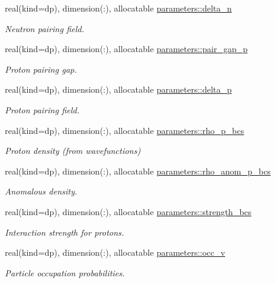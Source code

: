 \begin{DoxyCompactItemize}
real(kind=dp), dimension(\+:), allocatable \mbox{\hyperlink{group__PAIRING_ga1a7cf61c64e34d8c4ff1348bea510826}{parameters\+::delta\+\_\+n}}
\begin{DoxyCompactList}\small\item\em Neutron pairing field. \end{DoxyCompactList}\item 
real(kind=dp), dimension(\+:), allocatable \mbox{\hyperlink{group__PAIRING_ga80c6085ca6be5adceadc0f7167218231}{parameters\+::pair\+\_\+gap\+\_\+p}}
\begin{DoxyCompactList}\small\item\em Proton pairing gap. \end{DoxyCompactList}\item 
real(kind=dp), dimension(\+:), allocatable \mbox{\hyperlink{group__PAIRING_gadffdf74625256112759c5d17e8cfeafc}{parameters\+::delta\+\_\+p}}
\begin{DoxyCompactList}\small\item\em Proton pairing field. \end{DoxyCompactList}\item 
real(kind=dp), dimension(\+:), allocatable \mbox{\hyperlink{group__PAIRING_ga346a8d96825c42b0dcb9763ed8770a68}{parameters\+::rho\+\_\+p\+\_\+bcs}}
\begin{DoxyCompactList}\small\item\em Proton density (from wavefunctions) \end{DoxyCompactList}\item 
real(kind=dp), dimension(\+:), allocatable \mbox{\hyperlink{group__PAIRING_ga5ad9bf187e94e8effb3d4bbcc2f2495f}{parameters\+::rho\+\_\+anom\+\_\+p\+\_\+bcs}}
\begin{DoxyCompactList}\small\item\em Anomalous density. \end{DoxyCompactList}\item 
real(kind=dp), dimension(\+:), allocatable \mbox{\hyperlink{group__PAIRING_ga94c22855af03bc8be5e687f4c8a80ee1}{parameters\+::strength\+\_\+bcs}}
\begin{DoxyCompactList}\small\item\em Interaction strength for protons. \end{DoxyCompactList}\item 
real(kind=dp), dimension(\+:), allocatable \mbox{\hyperlink{group__PAIRING_ga653f936e90e0606e8b49069e9d2c03d4}{parameters\+::occ\+\_\+v}}
\begin{DoxyCompactList}\small\item\em Particle occupation probabilities. \end{DoxyCompactList}\item 

\end{DoxyCompactItemize}
